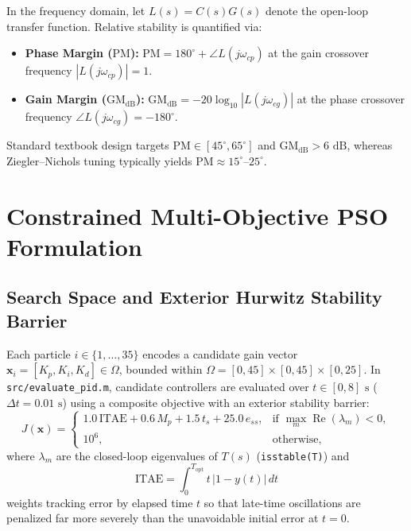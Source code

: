 \documentclass[11pt,a4paper]{article}
\begin{document}
In the frequency domain, let $L(s) = C(s)G(s)$ denote the open-loop transfer function. Relative stability is quantified via:
\begin{itemize}[leftmargin=2em]
  \item \textbf{Phase Margin ($\text{PM}$):} $\text{PM} = 180^\circ + \angle L(j\omega_{cp})$ at the gain crossover frequency $|L(j\omega_{cp})| = 1$.
  \item \textbf{Gain Margin ($\text{GM}_{\text{dB}}$):} $\text{GM}_{\text{dB}} = -20\log_{10}|L(j\omega_{cg})|$ at the phase crossover frequency $\angle L(j\omega_{cg}) = -180^\circ$.
\end{itemize}
Standard textbook design targets $\text{PM} \in [45^\circ, 65^\circ]$ and $\text{GM}_{\text{dB}} > 6\text{ dB}$, whereas Ziegler--Nichols tuning typically yields $\text{PM} \approx 15^\circ\text{--}25^\circ$.

\section{Constrained Multi-Objective PSO Formulation}

\subsection{Search Space and Exterior Hurwitz Stability Barrier}
Each particle $i \in \{1, \dots, 35\}$ encodes a candidate gain vector $\mathbf{x}_i = [K_p, K_i, K_d] \in \Omega$, bounded within $\Omega = [0, 45] \times [0, 45] \times [0, 25]$. In \texttt{src/evaluate\_pid.m}, candidate controllers are evaluated over $t \in [0, 8]\text{ s}$ ($\Delta t = 0.01\text{ s}$) using a composite objective with an exterior stability barrier:
\begin{equation}
  J(\mathbf{x}) = \begin{cases}
    1.0\,\text{ITAE} + 0.6\,M_p + 1.5\,t_s + 25.0\,e_{ss}, & \text{if } \max_m \operatorname{Re}(\lambda_m) < 0, \\[4pt]
    10^6, & \text{otherwise},
  \end{cases}
  \label{eq:cost_function}
\end{equation}
where $\lambda_m$ are the closed-loop eigenvalues of $T(s)$ (\texttt{isstable(T)}) and
\begin{equation}
  \text{ITAE} = \int_0^{T_{\text{opt}}} t\,|1 - y(t)|\,dt
\end{equation}
weights tracking error by elapsed time $t$ so that late-time oscillations are penalized far more severely than the unavoidable initial error at $t = 0$.
\end{document}
